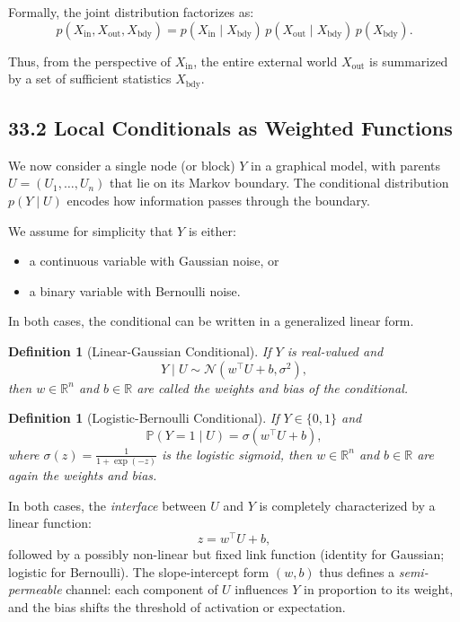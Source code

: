 \documentclass[12pt,letterpaper]{article}
\newtheorem{definition}[theorem]{Definition}
\theoremstyle{remark}
\begin{document}
Formally, the joint distribution factorizes as:
\[
p(X_{\text{in}}, X_{\text{out}}, X_{\text{bdy}})
= p(X_{\text{in}} \mid X_{\text{bdy}})\, p(X_{\text{out}} \mid X_{\text{bdy}})\, p(X_{\text{bdy}}).
\]

Thus, from the perspective of $X_{\text{in}}$, the entire external world $X_{\text{out}}$ is summarized by a set of sufficient statistics $X_{\text{bdy}}$.

\subsection{33.2 Local Conditionals as Weighted Functions}

We now consider a single node (or block) $Y$ in a graphical model, with parents $U = (U_1, \dots, U_n)$ that lie on its Markov boundary. The conditional distribution $p(Y \mid U)$ encodes how information passes through the boundary.

We assume for simplicity that $Y$ is either:

\begin{itemize}
  \item a continuous variable with Gaussian noise, or
  \item a binary variable with Bernoulli noise.
\end{itemize}

In both cases, the conditional can be written in a generalized linear form.

\begin{definition}[Linear-Gaussian Conditional]
If $Y$ is real-valued and
\[
Y \mid U \sim \mathcal{N}(w^\top U + b, \sigma^2),
\]
then $w \in \mathbb{R}^n$ and $b \in \mathbb{R}$ are called the \emph{weights} and \emph{bias} of the conditional.
\end{definition}

\begin{definition}[Logistic-Bernoulli Conditional]
If $Y \in \{0,1\}$ and
\[
\mathbb{P}(Y=1 \mid U) = \sigma(w^\top U + b),
\]
where $\sigma(z) = \frac{1}{1+\exp(-z)}$ is the logistic sigmoid, then $w \in \mathbb{R}^n$ and $b \in \mathbb{R}$ are again the \emph{weights} and \emph{bias}.
\end{definition}

In both cases, the \emph{interface} between $U$ and $Y$ is completely characterized by a linear function:
\[
z = w^\top U + b,
\]
followed by a possibly non-linear but fixed link function (identity for Gaussian; logistic for Bernoulli). The slope-intercept form $(w, b)$ thus defines a \emph{semi-permeable} channel: each component of $U$ influences $Y$ in proportion to its weight, and the bias shifts the threshold of activation or expectation.
\end{document}
